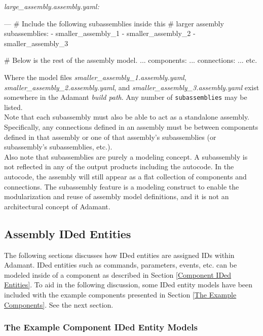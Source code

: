 \textit{large\_assembly.assembly.yaml:}
\vspace{5mm} %
\begin{yamlcode}
---
# Include the following subassemblies inside this
# larger assembly
subassemblies:
  - smaller_assembly_1 
  - smaller_assembly_2 
  - smaller_assembly_3 

# Below is the rest of the assembly model.
  ...
components:
  ... 
connections: 
  ...
  etc.
\end{yamlcode}
\vspace{5mm} %

Where the model files \textit{smaller\_assembly\_1.assembly.yaml}, \textit{smaller\_assembly\_2.assembly.yaml}, and \textit{smaller\_assembly\_3.assembly.yaml} exist somewhere in the Adamant \textit{build path}. Any number of \texttt{subassemblies} may be listed. \\

Note that each subassembly must also be able to act as a standalone assembly. Specifically, any connections defined in an assembly must be between components defined in that assembly or one of that assembly's subassemblies (or subassembly's subassemblies, etc.). \\

Also note that subassemblies are purely a modeling concept. A subassembly is not reflected in any of the output products including the autocode. In the autocode, the assembly will still appear as a flat collection of components and connections. The subassembly feature is a modeling construct to enable the modularization and reuse of assembly model definitions, and it is not an architectural concept of Adamant.

\subsection{Assembly IDed Entities} \label{Assembly ID Assignment}

The following sections discusses how IDed entities are assigned IDs within Adamant. IDed entities such as commands, parameters, events, etc. can be modeled inside of a component as described in Section \ref{Component IDed Entities}. To aid in the following discussion, some IDed entity models have been included with the example components presented in Section \ref{The Example Components}. See the next section. 

\subsubsection{The Example Component IDed Entity Models}

